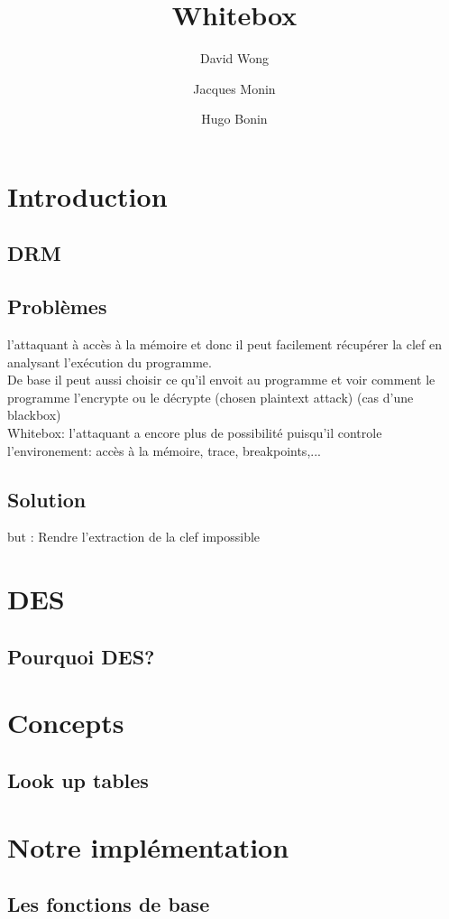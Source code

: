 \documentclass[a4paper,12pt]{article}
\author{David Wong
  \and Jacques Monin
  \and Hugo Bonin}
\title{Whitebox}
\begin{document}
\maketitle

\section{Introduction}

\subsection{DRM}

\subsection{Problèmes}

l'attaquant à accès à la mémoire et donc il peut facilement récupérer la clef en analysant l'exécution du programme.\\
De base il peut aussi choisir ce qu'il envoit au programme et voir comment le programme l'encrypte ou le décrypte (chosen plaintext attack) (cas d'une blackbox)\\
Whitebox: l'attaquant a encore plus de possibilité puisqu'il controle l'environement: accès à la mémoire, trace, breakpoints,...

\subsection{Solution}

but : Rendre l'extraction de la clef impossible

\section{DES}

\subsection{Pourquoi DES?}

\section{Concepts}

\subsection{Look up tables}

\section{Notre implémentation}

\subsection{Les fonctions de base}
\end{document}
